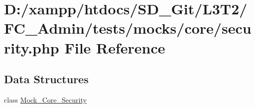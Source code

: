 \hypertarget{tests_2mocks_2core_2_security_8php}{}\section{D\+:/xampp/htdocs/\+S\+D\+\_\+\+Git/\+L3\+T2/\+F\+C\+\_\+\+Admin/tests/mocks/core/security.php File Reference}
\label{tests_2mocks_2core_2_security_8php}
\subsection*{Data Structures}
\begin{DoxyCompactItemize}
\item 
class \hyperlink{class_mock___core___security}{Mock\+\_\+\+Core\+\_\+\+Security}
\end{DoxyCompactItemize}
